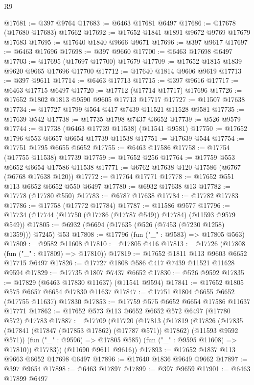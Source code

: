 \begin{lexlean}{R9}
\begin{coremodule}
{{{{{{{{{{{{{{{{{{{{{{{{{{{{{{{{{{{{{{{{{{{{{{{{{{{{{{{{{{{{{{{{{{{{{{{{{{{{{{{{{{{{@17681 := @397 @9764
@17683 := @6463 @17681 @6497
@17686 := @17678 (@17680 @17683) @17662
@17692 := @17652 @1841 @1891 @9672 @9769 @17679 @17683
@17695 := @17640 @1840 @9666 @9671
@17696 := @397 @9617
@17697 := @6463 @17696
@17698 := @397 @9660
@17700 := @6463 @17698 @6497
@17703 := @17695 (@17697 @17700) @17679
@17709 := @17652 @1815 @1839 @9620 @9665 @17696 @17700
@17712 := @17640 @1814 @9606 @9619
@17713 := @397 @9611
@17714 := @6463 @17713
@17715 := @397 @9616
@17717 := @6463 @17715 @6497
@17720 := @17712 (@17714 @17717) @17696
@17726 := @17652 @1802 @1813 @9590 @9605 @17713 @17717
@17727 := @11507 @17638
@17734 := @17727 @1799 @564 @417 @7439 @11521 @11528 @9581
@17735 := @17639 @542
@17738 := @17735 @1798 @7437 @6652
@17739 := @526 @9579
@17744 := @17738 (@6463 @17739 @11538) (@11541 @9581)
@17750 := @17652 @1796 @553 @6657 @6654 @17739 @11538
@17751 := @17639 @544
@17754 := @17751 @1795 @6655 @6652
@17755 := @6463 @17586
@17758 := @17754 (@17755 @11538) @17739
@17759 := @17652 @256
@17764 := @17759 @553 @6652 @6654 @17586 @11538
@17771 := @6762 @17638 @120 @17586 (@6767 (@6768 @17638 @120))
@17772 := @17764 @17771
@17778 := @17652 @551 @113 @6652 @6652 @550 @6497
@17780 := @6932 @17638 @13
@17782 := @17778 (@17780 @550)
@17783 := @6787 @17638
@17784 := @17782 @17783
@17786 := @17758 (@17772 @17784)
@17787 := @11586 @9577
@17796 := @17734 (@17744 (@17750 (@17786 (@17787 @549)) @17784) (@11593 @9579 @549))
@17805 := @6932 (@6694 (@17635 (@526 (@7453 (@7230 @1258) @1359))) @7245) @53
@17808 := @17796 (fun ("_" : @9583) => @17805 @563)
@17809 := @9582 @11608
@17810 := @17805 @416
@17813 := @17726 (@17808 (fun ("_" : @17809) => @17810))
@17819 := @17652 @1811 @113 @9603 @6652 @17715 @6497
@17826 := @17727 @1808 @586 @417 @7439 @11521 @11628 @9594
@17829 := @17735 @1807 @7437 @6652
@17830 := @526 @9592
@17835 := @17829 (@6463 @17830 @11637) (@11541 @9594)
@17841 := @17652 @1805 @575 @6657 @6654 @17830 @11637
@17847 := @17751 @1804 @6655 @6652 (@17755 @11637) @17830
@17853 := @17759 @575 @6652 @6654 @17586 @11637 @17771
@17862 := @17652 @573 @113 @6652 @6652 @572 @6497 (@17780 @572) @17783
@17887 := @17709
    (@17720
      (@17813
        (@17819
          (@17826
            (@17835 (@17841 (@17847 (@17853 @17862) (@17787 @571)) @17862) (@11593 @9592 @571))
            (fun ("_" : @9596) => @17805 @585)
            (fun ("_" : @9595 @11608) => @17810))
          @17783))
      (@11690 @9611 @9616))
@17893 := @17652 @1837 @113 @9663 @6652 @17698 @6497
@17896 := @17640 @1836 @9649 @9662
@17897 := @397 @9654
@17898 := @6463 @17897
@17899 := @397 @9659
@17901 := @6463 @17899 @6497
}}}}}}}}}}}}}}}}}}}}}}}}}}}}}}}}}}}}}}}}}}}}}}}}}}}}}}}}}}}}}}}}}}}}}}}}}}}}}}}}}}}}
\end{coremodule}
\end{lexlean}
